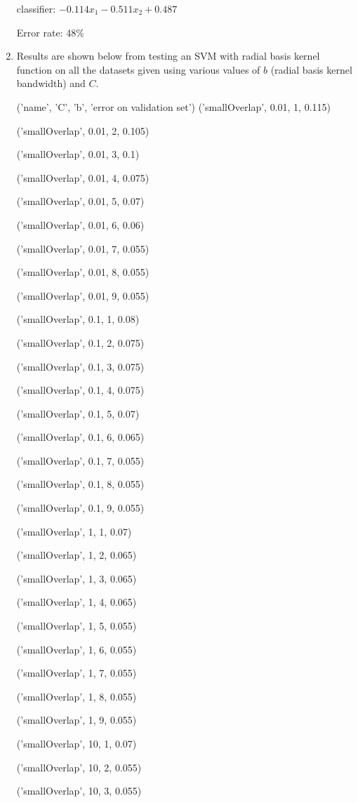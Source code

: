 \documentclass{paper}
\begin{document}
\begin{enumerate}
classifier: $-0.114 x_1 -0.511 x_2 + 0.487$

Error rate: 48\%

    \item

    Results are shown below from testing an SVM with radial basis kernel function on all the datasets given using various values of $b$ (radial basis kernel bandwidth) and $C$.

('name', 'C', 'b', 'error on validation set')
('smallOverlap', 0.01, 1, 0.115)

('smallOverlap', 0.01, 2, 0.105)

('smallOverlap', 0.01, 3, 0.1)

('smallOverlap', 0.01, 4, 0.075)

('smallOverlap', 0.01, 5, 0.07)

('smallOverlap', 0.01, 6, 0.06)

('smallOverlap', 0.01, 7, 0.055)

('smallOverlap', 0.01, 8, 0.055)

('smallOverlap', 0.01, 9, 0.055)

('smallOverlap', 0.1, 1, 0.08)

('smallOverlap', 0.1, 2, 0.075)

('smallOverlap', 0.1, 3, 0.075)

('smallOverlap', 0.1, 4, 0.075)

('smallOverlap', 0.1, 5, 0.07)

('smallOverlap', 0.1, 6, 0.065)

('smallOverlap', 0.1, 7, 0.055)

('smallOverlap', 0.1, 8, 0.055)

('smallOverlap', 0.1, 9, 0.055)

('smallOverlap', 1, 1, 0.07)

('smallOverlap', 1, 2, 0.065)

('smallOverlap', 1, 3, 0.065)

('smallOverlap', 1, 4, 0.065)

('smallOverlap', 1, 5, 0.055)

('smallOverlap', 1, 6, 0.055)

('smallOverlap', 1, 7, 0.055)

('smallOverlap', 1, 8, 0.055)

('smallOverlap', 1, 9, 0.055)

('smallOverlap', 10, 1, 0.07)

('smallOverlap', 10, 2, 0.055)

('smallOverlap', 10, 3, 0.055)


\end{enumerate}
\end{document}
